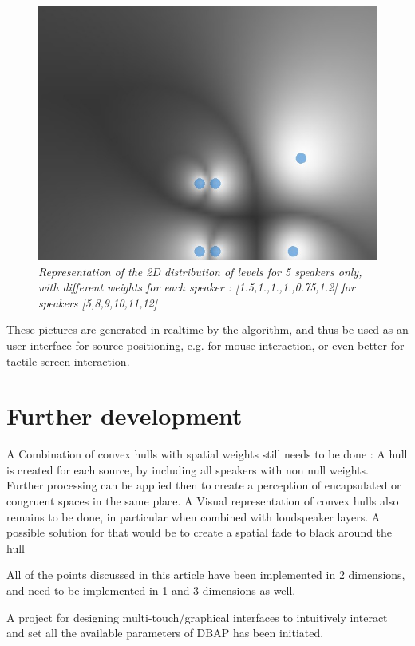 \documentclass[twoside,10pt]{article}
\begin{document}
\begin{figure}[ht]
\centerline{\includegraphics[scale=0.5]{spk_groups}}
\caption{{\it Representation of the 2D distribution of levels for 5 speakers only, with different weights for each speaker : [1.5,1.,1.,1.,0.75,1.2] for speakers [5,8,9,10,11,12]}}  
\label{5spk_weights}
\end{figure}

These pictures are generated in realtime by the algorithm, and thus be used as an user interface for source positioning, e.g. for mouse interaction, or even better for tactile-screen interaction. 


\section{Further development}

A Combination of convex hulls with spatial weights still needs to be done : A hull is created for each source, by including all speakers with non null weights. Further processing can be applied then to create a perception of encapsulated or congruent spaces in the same place.
A Visual representation of convex hulls also remains to be done, in particular when combined with loudspeaker layers. A possible solution for that would be to create a spatial fade to black around the hull 

All of the points discussed in this article have been implemented in 2 dimensions, and need to be implemented in 1 and 3 dimensions as well.  

A project for designing multi-touch/graphical interfaces to intuitively interact and set all the available parameters of DBAP has been initiated.
\end{document}
